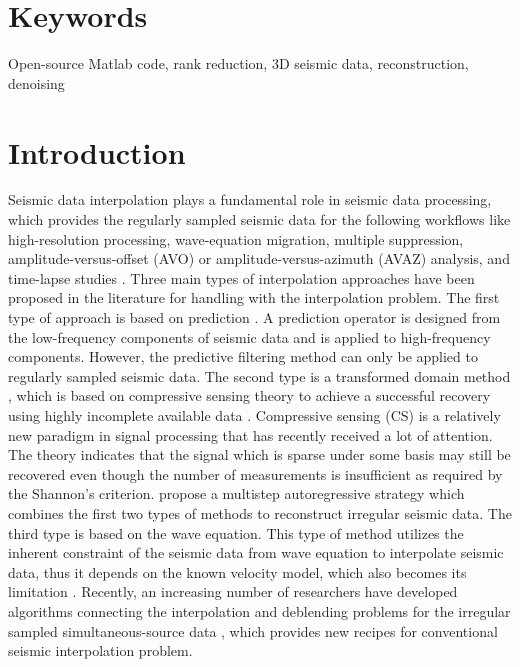 \section{Keywords}
Open-source Matlab code, rank reduction, 3D seismic data, reconstruction, denoising

\section{Introduction}
Seismic data interpolation plays a fundamental role in seismic data processing, which provides the regularly sampled seismic data for the following workflows like high-resolution processing, wave-equation migration, multiple suppression, amplitude-versus-offset (AVO) or amplitude-versus-azimuth (AVAZ) analysis, and time-lapse studies \cite[]{chiu2014,yangkang2015shape,benfeng2015,shuwei2015seg,zhongwei2016,zhangdong2016}. Three main types of interpolation approaches have been proposed in the literature for handling with the interpolation problem. The first type of approach is based on prediction \cite[]{spitz1991,porsani1999}. A prediction operator is designed from the low-frequency components of seismic data and is applied to high-frequency components. However, the predictive filtering method can only be applied to regularly sampled seismic data. The second type is a transformed domain method \cite[]{candes20061,yangkang20142,shuwei,liuwei2015}, which is based on compressive sensing theory \cite[]{candes20062,donoho2006} to achieve a successful recovery using highly incomplete available data \cite[]{sacchi1998,wang2003,yangkang2014halfthr}.  Compressive sensing (CS) is a relatively new paradigm \cite[]{candes20062,donoho2006,donoho20061,shuwei20164,liuwei20162} in signal processing that has recently received a lot of attention. The theory indicates that the signal which is sparse under some basis may still be recovered even though the number of measurements is insufficient as required by the Shannon's criterion. \cite{mostafa2007} propose a multistep autoregressive strategy which combines the first two types of methods to reconstruct irregular seismic data. The third type is based on the wave equation. This type of method utilizes the inherent constraint of the seismic data from wave equation to interpolate seismic data, thus it depends on the known velocity model, which also becomes its limitation \cite[]{canning1996,fomel2003}. Recently, an increasing number of researchers have developed algorithms connecting the interpolation and deblending \cite[]{berkhout2008} problems for the irregular sampled simultaneous-source data \cite[]{chengbo2013}, which provides new recipes for conventional seismic interpolation problem. 

